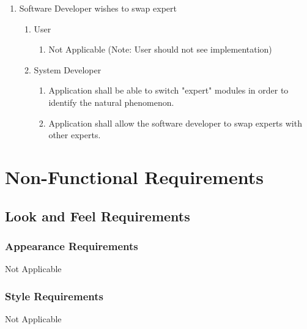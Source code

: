 \documentclass[]{article}
\begin{document}
\begin{enumerate}[{BE}1.]
\begin{enumerate}[{VP4}.1]
\begin{enumerate}
				
				
			\end{enumerate}
	\end{enumerate}


	\item Software Developer wishes to swap expert
	\begin{enumerate}[{VP1}.5.1]
		\item User
			\begin{enumerate}
				\item Not Applicable (Note: User should not see implementation)
			\end{enumerate}
		\item System Developer
			\begin{enumerate}
			\item Application shall be able to switch "expert" modules in order to identify the natural phenomenon.
			\item Application shall allow the software developer to swap experts with other experts.
			\end{enumerate}
	\end{enumerate}
\end{enumerate}

\section{Non-Functional Requirements}
\label{sec:non-functional_requirements}
\subsection{Look and Feel Requirements}
\label{sub:look_and_feel_requirements}

\subsubsection{Appearance Requirements}
\label{ssub:appearance_requirements}
Not Applicable

\subsubsection{Style Requirements}
\label{ssub:style_requirements}
	 Not Applicable
\end{document}
